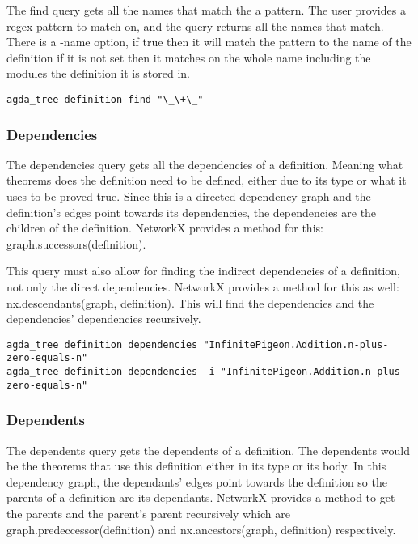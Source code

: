 The find query gets all the names that match the a pattern. The user provides a
regex pattern to match on, and the query returns all the names that match.
There is a -name option, if true then it will match the pattern to the name of
the definition if it is not set then it matches on the whole name including the
modules the definition it is stored in.

\begin{lstlisting}
agda_tree definition find "\_\+\_"
\end{lstlisting}

\subsubsection{Dependencies}

The dependencies query gets all the dependencies of a definition. Meaning what
theorems does the definition need to be defined, either due to its type or what
it uses to be proved true. Since this is a directed dependency graph and the
definition's edges point towards its dependencies, the dependencies are the
children of the definition. NetworkX provides a method for this:
\textsf{graph.successors(definition)}.

This query must also allow for finding the indirect dependencies of a
definition, not only the direct dependencies. NetworkX provides a method for
this as well: \textsf{nx.descendants(graph, definition)}. This will find the
dependencies and the dependencies' dependencies recursively.

\begin{lstlisting}
agda_tree definition dependencies "InfinitePigeon.Addition.n-plus-zero-equals-n"
agda_tree definition dependencies -i "InfinitePigeon.Addition.n-plus-zero-equals-n"
\end{lstlisting}

\subsubsection{Dependents}

The dependents query gets the dependents of a definition. The dependents would
be the theorems that use this definition either in its type or its body. In
this dependency graph, the dependants' edges point towards the definition so
the parents of a definition are its dependants. NetworkX provides a method to
get the parents and the parent's parent recursively which are
\textsf{graph.predeccessor(definition)} and \textsf{nx.ancestors(graph,
definition)} respectively.

